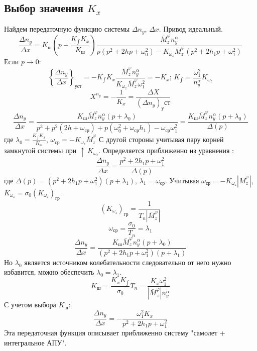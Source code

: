\documentclass{article}
\begin{document}
\subsection{Выбор значения $K_x$}
Найдем передаточную функцию системы $\Delta n_y$, $\Delta x$. Привод идеальный.
\begin{equation}
\frac{\Delta n_y}{\Delta x} = K_ш (p + \frac{K_{\int} K_x}{K_ш}) \frac{\bar{M}_z^{\varphi} n_y^\alpha}{p(p^2 +  2 h p + \omega_0^2) - K_{\omega_z} \bar{M}_z^{\varphi} (p^2 + 2h_{1}p + \omega_1^2)}
\end{equation}
Если $p \rightarrow 0$:
\[
 \left\{ \frac{\Delta n_y}{\Delta x} \right\}_{уст}  = -K_{\int}K_x \frac{\bar{M}_z^{\varphi} n_y^\alpha}{K_{\omega_z} \bar{M}_z^{\varphi} \omega_1^2} = -K_x; \, K_{\int} = \frac{\omega_1^2}{n_y^\alpha} K_{\omega_z}
\]
\[
X^{n_y} = - \frac{1}{K_x} = \frac{\Delta X}{(\Delta n_y)_уст}
\]
\[
\frac{\Delta n_y}{\Delta x} = \frac{K_{ш} \bar{M}_z^\varphi n_y^\alpha(p + \lambda_0)}{p^3 + p^2 (2h+\omega_{ср}) + p (\omega_0^2 + \omega_{ср} h_1) - \omega_{ср} \omega_1^2} = \frac{K_{ш} \bar{M}_z^\varphi n_y^\alpha(p + \lambda_0)}{\Delta(p)}
\]
где $\lambda_0 = \frac{K_{\int} K_x}{K_ш}$, $\omega_{ср} = -K_{\omega_z}\bar{M}_z^\varphi$
С другой стороны учитывая пару корней замкнутой системы при $\uparrow \, K_{\omega_z}$. Определяется приближенно из уравнения :
\[
\frac{\Delta n_y}{\Delta x} = \frac{p^2 + 2 h_1 p + \omega_1^2}{\Delta(p)}
\]
где $\Delta(p) = (p^2 + 2 h_1 p + \omega_1^2)(p + \lambda_1)$, $\lambda_1 = \omega_{ср}$. Учитывая $\omega_{ср} = - K_{\omega_z} |\bar{M}_z^\varphi|$, $K_{\omega_z} = \sigma_0 (K_{\omega_z})_{гр}$.\\
\[
(K_{\omega_z})_{гр} = \frac{1}{T_n |\bar{M}_z^\varphi|}
\]
\[
\omega_{ср} = \frac{\sigma_0}{T_n} = \lambda_1
\]
\[
\frac{\Delta n_y}{\Delta x} = \frac{K_{ш} \bar{M}_z^\varphi n_y^\alpha(p + \lambda_0)}{(p^2 + 2h_{1} p + \omega_1^2)(p+\lambda_1)}
\]
Но $\lambda_0$ является источником колебательности следовательно от него нужно избавится, можно обеспечить $\lambda_0 = \lambda_1$.
\[
K_{ш} = \frac{K_{x} K_{\int}}{\sigma_0} T_n = \frac{K_x \omega_1^2}{|\bar{M}_z^\varphi| n_y^\alpha}
\]
С учетом выбора $K_{ш}$:
\begin{equation}
\frac{\Delta n_y}{\Delta x} = -\frac{\omega_1^2 K_x}{p^2 + 2 h_1 p + \omega_1 ^2}
\end{equation}
Эта передаточная функция описывает приближенно систему "самолет + интегральное АПУ".
\end{document}
